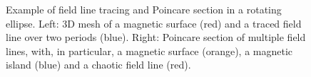 \documentclass[my_thesis.tex]{subfiles}
\begin{document}
\begin{figure}
	\centering
	\hfill
	\caption{Example of field line tracing and Poincare section in a rotating ellipse. Left: 3D mesh of a magnetic surface (red) and a traced field line over two periods (blue). Right: Poincare section of multiple field lines, with, in particular, a magnetic surface (orange), a magnetic island (blue) and a chaotic field line (red).}
	\label{fig poincare section}
\end{figure}


\end{document}
